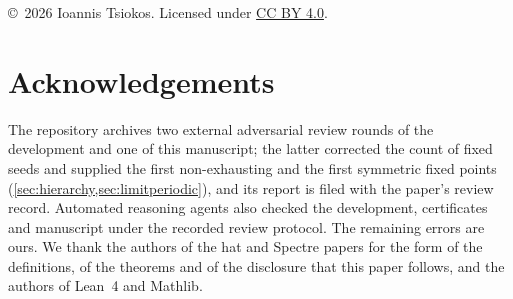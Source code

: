 \documentclass[11pt,reqno]{amsart}
\begin{document}
\maketitle

\frontmatternote
\begin{center}
  {\small\copyright\ 2026 Ioannis Tsiokos. Licensed under
  \href{https://creativecommons.org/licenses/by/4.0/}{CC BY 4.0}.}
\end{center}









\clearpage



\section*{Acknowledgements}
The repository archives two external adversarial review rounds of the development and one of
this manuscript; the latter corrected the count of fixed seeds and supplied the first
non-exhausting and the first symmetric fixed points (\cref{sec:hierarchy,sec:limitperiodic}),
and its report is filed with the paper's review record. Automated reasoning agents also
checked the development, certificates and manuscript under the recorded review protocol. The
remaining errors are ours. We thank the authors of the hat and Spectre papers for the form of
the definitions, of the theorems and of the disclosure that this paper follows, and the authors
of Lean~4 and Mathlib.
\end{document}
